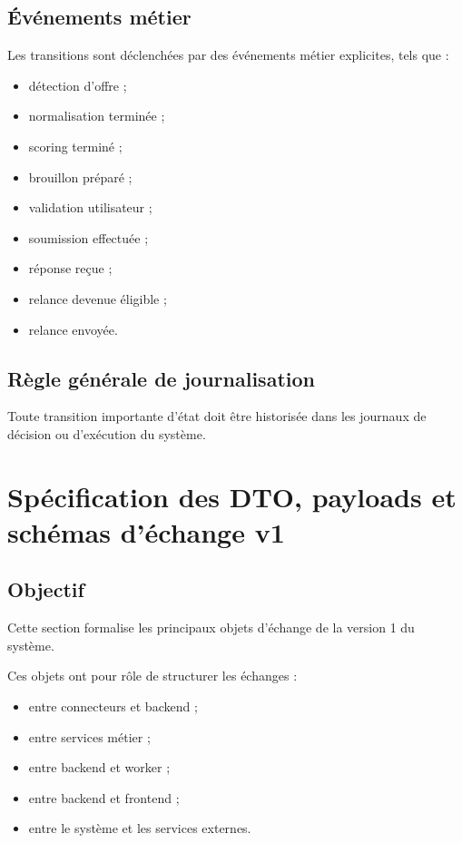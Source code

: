 \documentclass[11pt,a4paper]{article}
\begin{document}
\subsection{Événements métier}

Les transitions sont déclenchées par des événements métier explicites, tels que :

\begin{itemize}
    \item détection d’offre ;
    \item normalisation terminée ;
    \item scoring terminé ;
    \item brouillon préparé ;
    \item validation utilisateur ;
    \item soumission effectuée ;
    \item réponse reçue ;
    \item relance devenue éligible ;
    \item relance envoyée.
\end{itemize}

\subsection{Règle générale de journalisation}

Toute transition importante d’état doit être historisée dans les journaux de décision ou d’exécution du système.

\section{Spécification des DTO, payloads et schémas d’échange v1}

\subsection{Objectif}

Cette section formalise les principaux objets d’échange de la version 1 du système.

Ces objets ont pour rôle de structurer les échanges :

\begin{itemize}
    \item entre connecteurs et backend ;
    \item entre services métier ;
    \item entre backend et worker ;
    \item entre backend et frontend ;
    \item entre le système et les services externes.
\end{itemize}
\end{document}
